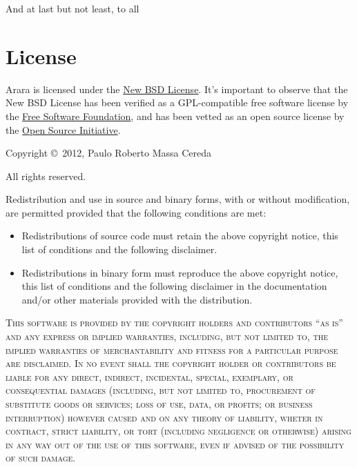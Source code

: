 \documentclass[a4paper,twoside,12pt]{memoir}
\begin{document}
And at last but not least, to all 

\cleardoublepage

\section*{License}

Arara is licensed under the \href{http://www.opensource.org/licenses/bsd-license.php}{New BSD License}. It's important to observe that the New BSD License has been verified as a GPL-compatible free software license by the \href{http://www.fsf.org/}{Free Software Foundation}, and has been vetted as an open source license by the \href{http://www.opensource.org/}{Open Source Initiative}.

\vfill

\begin{infobox}[skipabove=\baselineskip plus 2pt minus 1pt]

\vspace{.5em}

\noindent Copyright \copyright\ 2012, Paulo Roberto Massa Cereda

\noindent All rights reserved.

\vspace{1em}

\noindent Redistribution and use in source and binary forms, with or without modification, are permitted provided that the following conditions are met:

\begin{itemize}
\item Redistributions of source code must retain the above copyright notice, this list of conditions and the following disclaimer.
\item Redistributions in binary form must reproduce the above copyright notice, this list of conditions and the following disclaimer in the documentation and/or other materials provided with the distribution.
\end{itemize}

\vspace{1em}

\noindent\textsc{This software is provided by the copyright holders and contributors ``as is'' and any express or implied warranties, including, but not limited to, the implied warranties of merchantability and fitness for a particular purpose are disclaimed. In no event shall the copyright holder or contributors be liable for any direct, indirect, incidental, special, exemplary, or consequential damages (including, but not limited to, procurement of substitute goods or services; loss of use, data, or profits; or business interruption) however caused and on any theory of liability, wheter in contract, strict liability, or tort (including negligence or otherwise) arising in any way out of the use of this software, even if advised of the possibility of such damage.}
\end{infobox}
\end{document}
